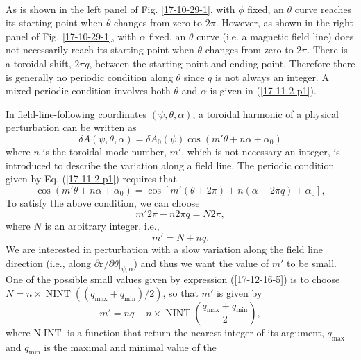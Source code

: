 \documentclass{article}
\newcommand{\nobracket}{}
\newcommand{\tmop}[1]{\ensuremath{\operatorname{#1}}}
\begin{document}
\

As is shown in the left panel of Fig. \ref{17-10-29-1}, with $\phi$ fixed, an
$\theta$ curve reaches its starting point when $\theta$ changes from zero to
$2 \pi$. However, as shown in the right panel of Fig. \ref{17-10-29-1}, with
$\alpha$ fixed, an $\theta$ curve (i.e. a magnetic field line) does not
necessarily reach its starting point when $\theta$ changes from zero to $2
\pi$. There is a toroidal shift, $2 \pi q$, between the starting point and
ending point. Therefore there is generally no periodic condition along
$\theta$ since $q$ is not always an integer. A mixed periodic condition
involves both $\theta$ and $\alpha$ is given in (\ref{17-11-2-p1}).

In field-line-following coordinates $(\psi, \theta, \alpha)$, a toroidal
harmonic of a physical perturbation can be written as
\begin{equation}
  \label{17-10-30-e1} \delta A (\psi, \theta, \alpha) = \delta A_0 (\psi) \cos
  (m' \theta + n \alpha + \alpha_0)
\end{equation}
where $n$ is the toroidal mode number, $m'$, which is not necessary an
integer, is introduced to describe the variation along a field line. The
periodic condition given by Eq. (\ref{17-11-2-p1}) requires that
\begin{equation}
  \cos (m' \theta + n \alpha + \alpha_0) = \cos [m' (\theta + 2 \pi) + n
  (\alpha - 2 \pi q) + \alpha_0],
\end{equation}
To satisfy the above condition, we can choose
\begin{equation}
  m' 2 \pi - n 2 \pi q = N 2 \pi,
\end{equation}
where $N$ is an arbitrary integer, i.e.,
\begin{equation}
  \label{17-12-16-5} m' = N + n q.
\end{equation}
We are interested in perturbation with a slow variation along the field line
direction (i.e., along $\partial \mathbf{r}/ \partial \theta |_{\psi, \alpha}
\nobracket$) and thus we want the value of $m'$ to be small. One of the
possible small values given by expression (\ref{17-12-16-5}) is to choose $N =
n \times \tmop{NINT} ((q_{\max} + q_{\min}) / 2)$, so that $m'$ is given by
\begin{equation}
  \label{18-5-4-p1} m' = n q - n \times \tmop{NINT} \left( \frac{q_{\max} +
  q_{\min}}{2} \right),
\end{equation}
where N$\tmop{INT}$ is a function that return the nearest integer of its
argument, $q_{\max}$ and $q_{\min}$ is the maximal and minimal value of the
\end{document}
